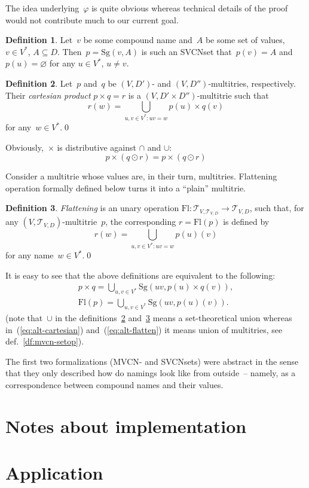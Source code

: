 \documentclass{article}
\theoremstyle{definition}
\newtheorem{Df}{Definition}
\newcommand{\setcharmt}{T}
\newcommand{\setsymbol}[3]{\mathcal{#1}_{#2,#3}}
\newcommand{\setmt}[2]{\setsymbol{\setcharmt}{#1}{#2}}
\newcommand{\flatten}{\mathrm{Fl}}
\newcommand{\singleleaf}{\mathrm{Sg}}
\begin{document}
The idea underlying~$\varphi$ is quite obvious whereas technical details of the
proof would not contribute much to our current goal.



\begin{Df}
Let~$v$ be some compound name and~$A$ be some set of values, $v\in V^\ast$,
$A\subseteq D$.  Then~$p = \singleleaf(v,A)$ is such an SVCNset that~$p(v) =
A$ and~$p(u) = \varnothing$ for any $u\in V^\ast$, $u\neq v$.
\end{Df}

\begin{Df}\label{df:cartesian}
Let~$p$ and~$q$ be $(V,D')$- and $(V,D'')$-multitries, respectively. Their
\emph{cartesian product} $p\times q = r$ is a $(V,D'\times D'')$-multitrie
such that
\[
  r(w) = \bigcup_{u,v\in V^\ast: uv = w} p(u) \times q(v)
\]
for any~$w\in V^\ast$.\qed
\end{Df}

Obviously,~$\times$ is distributive against $\cap$ and $\cup$:
\[
  p\times(q\odot r) = p\times(q\odot r)
\]

Consider a multitrie whose values are, in their turn, multitries.
Flattening operation formally defined below turns it into a ``plain'' multitrie.
\begin{Df}\label{df:flatten}
\emph{Flattening} is an unary operation $\flatten : \setmt{V}{\setmt{V}{D}}
\to\setmt{V}{D}$, such that, for any $(V,\setmt{V}{D})$-multitrie~$p$, the
corresponding $r=\flatten(p)$ is defined by
\[
  r(w) = \bigcup_{u,v\in V^\ast: uv = w} p(u)(v)
\]
for any name~$w\in V^\ast$.\qed
\end{Df}

It is easy to see that the above definitions are equivalent to the following:
\begin{eqnarray}
  \label{eq:alt-cartesian}
  p\times q =
    \bigcup_{u,v\in V^\ast} \singleleaf(uv, p(u) \times q(v)) ,\\
  \label{eq:alt-flatten}
  \flatten(p) =
    \bigcup_{u,v\in V^\ast} \singleleaf(uv, p(u)(v)) .
\end{eqnarray}
(note that~$\cup$ in the definitions~\ref{df:cartesian} and~\ref{df:flatten}
means a set-theoretical union whereas in~(\ref{eq:alt-cartesian})
and~(\ref{eq:alt-flatten}) it means union of multitries, see
def.~\ref{df:mvcn-setop}).

The first two formalizations (MVCN- and SVCNsets) were abstract in the sense
that they only described how do namings look like from outside~-- namely, as a
correspondence between compound names and their values.

\section{Notes about implementation}

\section{Application}
\end{document}
